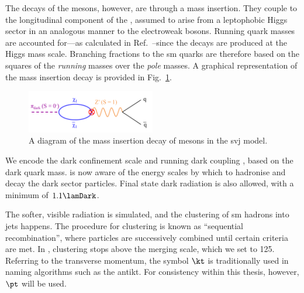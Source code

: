 The decays of the \Ppidark mesons, however, are through a mass insertion. They couple to the longitudinal component of the \PZprime, assumed to arise from a leptophobic Higgs sector in an analogous manner to the electroweak bosons. Running quark masses are accounted for---as calculated in Ref.~--since the decays are produced at the Higgs mass scale. Branching fractions to the \acrshort{sm} quarks are therefore based on the squares of the \emph{running} masses over the \emph{pole} masses. A graphical representation of the mass insertion decay is provided in Fig.~\ref{fig:svj_mass_insertion}.


\begin{figure}[htbp]
    \centering
    \includegraphics[width=0.5\textwidth]{figures/mass_insertion_diagram.pdf}
    \caption[A diagram of the mass insertion decay of \Ppidark mesons in the \schannel semi-visible jet model]{A diagram of the mass insertion decay of \Ppidark mesons in the \schannel \gls{svj} model.}
    \label{fig:svj_mass_insertion}
\end{figure}

We encode the dark confinement scale \lamDark and running dark coupling \aDark, based on the dark quark mass. \PYTHIA is now aware of the energy scales by which to hadronise and decay the dark sector particles. Final state dark radiation is also allowed, with a minimum \pt of $\text{1.1}\lamDark$.


The softer, visible radiation is simulated, and the clustering of \acrshort{sm} hadrons into \glspl{jet} happens. The procedure for clustering is known as ``sequential recombination'', where particles are successively combined until certain criteria are met. In \PYTHIA, clustering stops above the merging scale, which we set to 125\GeV. Referring to the transverse momentum, the symbol $\kt$ is traditionally used in naming algorithms such as the \gls{antikt}. For consistency within this thesis, however, $\pt$ will be used.

